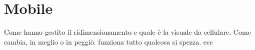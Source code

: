 \section{Mobile}
Come hanno gestito il ridimensionamento e quale è la visuale da cellulare. Come cambia, in meglio o in peggiò. funziona tutto qualcosa si spezza. ecc